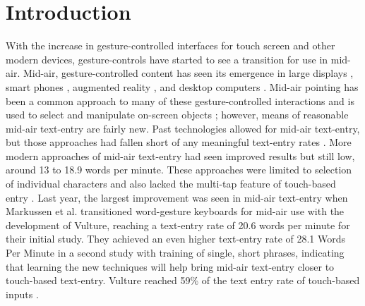 \chapter{Introduction}
With the increase in gesture-controlled interfaces for touch screen and other modern devices, gesture-controls have started to see a transition for use in mid-air. Mid-air, gesture-controlled content has seen its emergence in large displays \cite{ref_pan_zoom_large_dispalys,ref_large_screen_pointing_gestures}, smart phones \cite{ref_multiscale_navigation}, augmented reality \cite{ref_augmented_reality}, and desktop computers \cite{ref_leap_painting,ref_darren_thesis,ref_alvin_thesis,ref_leap_pointing_device}. Mid-air pointing has been a common approach to many of these gesture-controlled interactions and is used to select and manipulate on-screen objects \cite{ref_large_display_pointing,ref_air_pointing,ref_ray_pointing_large_displays,ref_shadow_reaching,ref_freehand_pointing_large_displays,ref_large_screen_pointing_gestures}; however, means of reasonable mid-air text-entry are fairly new. Past technologies allowed for mid-air text-entry, but those approaches had fallen short of any meaningful text-entry rates \cite{ref_visual_touchpad}. More modern approaches of mid-air text-entry had seen improved results but still low, around 13 \cite{ref_selection_based_mid_air} to 18.9 \cite{ref_mid_air_text_large_displays} words per minute. These approaches were limited to selection of individual characters and also lacked the multi-tap feature of touch-based entry \cite{ref_selection_based_mid_air,ref_airstroke,ref_mid_air_text_large_displays}. Last year, the largest improvement was seen in mid-air text-entry when Markussen et al. \cite{ref_vulture} transitioned word-gesture keyboards for mid-air use with the development of Vulture, reaching a text-entry rate of 20.6 words per minute for their initial study. They achieved an even higher text-entry rate of 28.1 Words Per Minute in a second study with training of single, short phrases, indicating that learning the new techniques will help bring mid-air text-entry closer to touch-based text-entry. Vulture reached 59\% of the text entry rate of touch-based inputs \cite{ref_vulture}.

